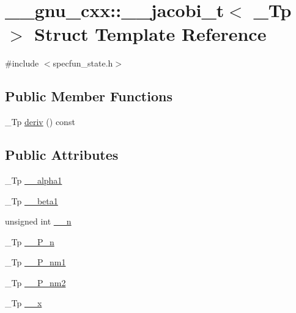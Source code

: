 \hypertarget{struct____gnu__cxx_1_1____jacobi__t}{}\section{\+\_\+\+\_\+gnu\+\_\+cxx\+:\+:\+\_\+\+\_\+jacobi\+\_\+t$<$ \+\_\+\+Tp $>$ Struct Template Reference}
\label{struct____gnu__cxx_1_1____jacobi__t}


{\ttfamily \#include $<$specfun\+\_\+state.\+h$>$}

\subsection*{Public Member Functions}
\begin{DoxyCompactItemize}
\item 
\+\_\+\+Tp \hyperlink{struct____gnu__cxx_1_1____jacobi__t_a2b1a1fc42308cb293dfcb1fa4a8202a6}{deriv} () const
\end{DoxyCompactItemize}
\subsection*{Public Attributes}
\begin{DoxyCompactItemize}
\item 
\+\_\+\+Tp \hyperlink{struct____gnu__cxx_1_1____jacobi__t_ab81da2815aa171345bf3893855b8c9a6}{\+\_\+\+\_\+alpha1}
\item 
\+\_\+\+Tp \hyperlink{struct____gnu__cxx_1_1____jacobi__t_ae1850b318140efaccce735800a4ae3fa}{\+\_\+\+\_\+beta1}
\item 
unsigned int \hyperlink{struct____gnu__cxx_1_1____jacobi__t_af31523139cac89ac8eff1f273b8fa351}{\+\_\+\+\_\+n}
\item 
\+\_\+\+Tp \hyperlink{struct____gnu__cxx_1_1____jacobi__t_a3f9683a63df91a8969ac4e456fa022d0}{\+\_\+\+\_\+\+P\+\_\+n}
\item 
\+\_\+\+Tp \hyperlink{struct____gnu__cxx_1_1____jacobi__t_ac7fb1ac753f89af0a158096e1ac84bc3}{\+\_\+\+\_\+\+P\+\_\+nm1}
\item 
\+\_\+\+Tp \hyperlink{struct____gnu__cxx_1_1____jacobi__t_a96be2d9b3e4daddccd75147a3ab1572e}{\+\_\+\+\_\+\+P\+\_\+nm2}
\item 
\+\_\+\+Tp \hyperlink{struct____gnu__cxx_1_1____jacobi__t_aa3213c7241c094633f0be6f210b04e17}{\+\_\+\+\_\+x}
\end{DoxyCompactItemize}


